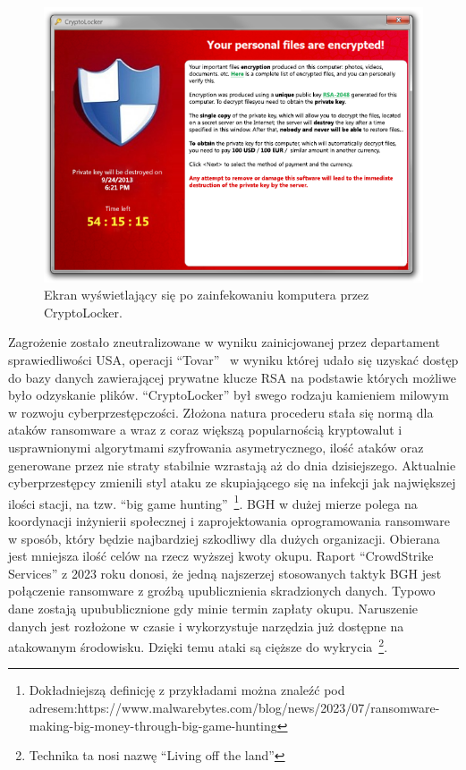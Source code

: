 \begin{figure}[H]
    \centering
    \includegraphics[width=0.75\linewidth]{rysunki/cryptolocker.png}
    \caption{Ekran wyświetlający się po zainfekowaniu komputera przez CryptoLocker.}
    \label{fig:enter-label}
\end{figure}
Zagrożenie zostało zneutralizowane w wyniku zainicjowanej przez departament sprawiedliwości USA, operacji \foreignquote{english}{Tovar}~\cite{tovar} w wyniku której udało się uzyskać dostęp do bazy danych zawierającej prywatne klucze RSA na podstawie których możliwe było odzyskanie plików.
\newline
\foreignquote{english}{CryptoLocker} był swego rodzaju kamieniem milowym w rozwoju cyberprzestępczości. Złożona natura procederu stała się normą dla ataków ransomware a wraz z coraz większą popularnością kryptowalut i usprawnionymi algorytmami szyfrowania asymetrycznego, ilość ataków oraz generowane przez nie straty stabilnie wzrastają aż do dnia dzisiejszego.
\newline
Aktualnie cyberprzestępcy zmienili styl ataku ze skupiającego się na infekcji jak największej ilości stacji, na tzw. \foreignquote{english}{big game hunting}~\footnote{Dokładniejszą definicję z przykładami można znaleźć pod adresem:\newline https://www.malwarebytes.com/blog/news/2023/07/ransomware-making-big-money-through-big-game-hunting}. BGH w dużej mierze polega na koordynacji inżynierii społecznej i zaprojektowania oprogramowania ransomware w sposób, który będzie najbardziej szkodliwy dla dużych organizacji. Obierana jest mniejsza ilość celów na rzecz wyższej kwoty okupu. Raport \foreignquote{english}{CrowdStrike Services} z 2023 roku donosi, że jedną najszerzej stosowanych taktyk BGH jest połączenie ransomware z groźbą upublicznienia skradzionych danych. Typowo dane zostają upubublicznione gdy minie termin zapłaty okupu. Naruszenie danych jest rozłożone w czasie i wykorzystuje narzędzia już dostępne na atakowanym środowisku. Dzięki temu ataki są cięższe do wykrycia~\footnote{Technika ta nosi nazwę \foreignquote{english}{Living off the land}}.

